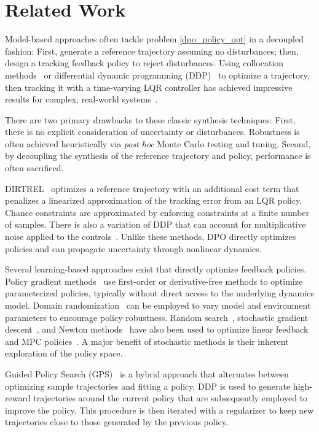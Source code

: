 \section{Related Work} \label{dpo_related_work}
Model-based approaches often tackle problem \eqref{dpo_policy_opt} in a decoupled fashion: First, generate a reference trajectory assuming no disturbances; then, design a tracking feedback policy to reject disturbances. Using collocation methods~\cite{stryk1993numerical} or differential dynamic programming (DDP)~\cite{jacobson1970differential} to optimize a trajectory, then tracking it with a time-varying LQR controller has achieved impressive results for complex, real-world systems~\cite{kuindersma2016optimization,moore2014robust}.

There are two primary drawbacks to these classic synthesis techniques: First, there is no explicit consideration of uncertainty or disturbances. Robustness is often achieved heuristically via \textit{post hoc} Monte Carlo testing and tuning. Second, by decoupling the synthesis of the reference trajectory and policy, performance is often sacrificed.

DIRTREL~\cite{manchester2019robust} optimizes a reference trajectory with an additional cost term that penalizes a linearized approximation of the tracking error from an LQR policy. Chance constraints are approximated by enforcing constraints at a finite number of samples. There is also a variation of DDP that can account for multiplicative noise applied to the controls~\cite{todorov2005generalized}. Unlike these methods, DPO directly optimizes policies and can propagate uncertainty through nonlinear dynamics.

Several learning-based approaches exist that directly optimize feedback policies. Policy gradient methods~\cite{silver2014deterministic, williams1992simple} use first-order or derivative-free methods to optimize parameterized policies, typically without direct access to the underlying dynamics model. Domain randomization~\cite{tobin2017domain} can be employed to vary model and environment parameters to encourage policy robustness. Random search~\cite{mania2018simple}, stochastic gradient descent~\cite{bu2019lqr}, and Newton methods~\cite{wytock2013fast} have also been used to optimize linear feedback and MPC policies~\cite{agrawal2020learning, amos2018differentiable}. A major benefit of stochastic methods is their inherent exploration of the policy space.

Guided Policy Search (GPS)~\cite{levine2013guided} is a hybrid approach that alternates between optimizing sample trajectories and fitting a policy. DDP is used to generate high-reward trajectories around the current policy that are subsequently employed to improve the policy. This procedure is then iterated with a regularizer to keep new trajectories close to those generated by the previous policy.

